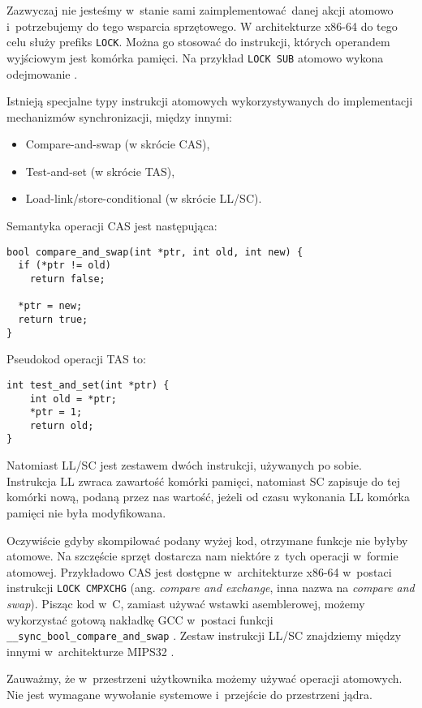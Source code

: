 \documentclass[shortabstract]{iithesis}
\theoremstyle{definition} \newtheorem*{definition}{Definicja}
\theoremstyle{definition} \newtheorem*{example}{Przykład}
\theoremstyle{definition} \newtheorem*{remark}{Uwaga}
\begin{document}
Zazwyczaj nie jesteśmy w~stanie sami zaimplementować danej akcji atomowo
i~potrzebujemy do tego wsparcia sprzętowego. W architekturze x86-64 do tego celu służy prefiks
\texttt{LOCK}. Można go stosować do instrukcji, których operandem wyjściowym jest komórka pamięci.
Na przykład \texttt{LOCK SUB} atomowo wykona odejmowanie \cite{intel-sdm:vol2}.

Istnieją specjalne typy instrukcji atomowych wykorzystywanych do implementacji mechanizmów synchronizacji,
między innymi:
\begin{itemize}
\item Compare-and-swap (w skrócie CAS),
\item Test-and-set (w skrócie TAS),
\item Load-link/store-conditional (w skrócie LL/SC).
\end{itemize}

Semantyka operacji CAS jest następująca:
\begin{lstlisting}
bool compare_and_swap(int *ptr, int old, int new) {
  if (*ptr != old)
    return false;

  *ptr = new;
  return true;
}
\end{lstlisting}

Pseudokod operacji TAS to:
\begin{lstlisting}
int test_and_set(int *ptr) {
    int old = *ptr;
    *ptr = 1;
    return old;
}
\end{lstlisting}

Natomiast LL/SC jest zestawem dwóch instrukcji, używanych po sobie. Instrukcja LL zwraca zawartość komórki pamięci,
natomiast SC zapisuje do tej komórki nową, podaną przez nas wartość, jeżeli od czasu wykonania LL komórka
pamięci nie była modyfikowana.

Oczywiście gdyby skompilować podany wyżej kod, otrzymane funkcje nie byłyby atomowe.
Na szczęście sprzęt dostarcza nam niektóre z~tych operacji w~formie atomowej.
Przykładowo CAS jest dostępne w~architekturze x86-64 w~postaci instrukcji \texttt{LOCK CMPXCHG}
(ang. \textit{compare and exchange}, inna nazwa na \textit{compare and swap}). Pisząc kod w~C, zamiast używać
wstawki asemblerowej, możemy wykorzystać gotową nakładkę GCC w~postaci funkcji
\texttt{\_\_sync\_bool\_compare\_and\_swap} \cite{gcc:comp-swap}.
Zestaw instrukcji LL/SC znajdziemy między innymi w~architekturze MIPS32 \cite{bib:mips32}.

Zauważmy, że w~przestrzeni użytkownika możemy używać operacji atomowych. Nie jest wymagane wywołanie systemowe
i~przejście do przestrzeni jądra.
\end{document}
